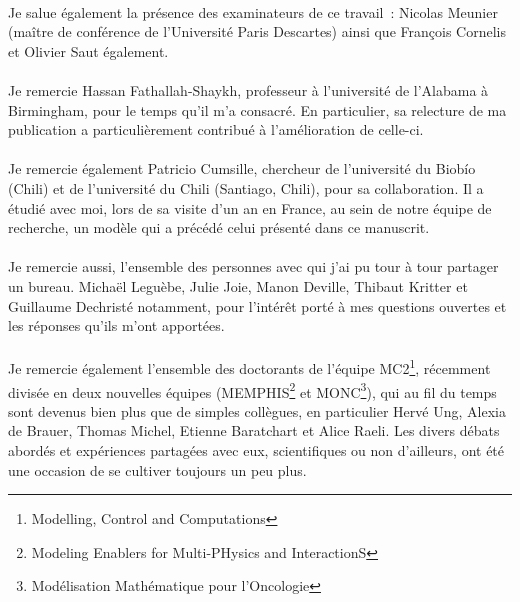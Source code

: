 \paragraph{}
Je salue également la présence des examinateurs de ce travail~: Nicolas Meunier (maître de conférence de l'Université Paris Descartes) ainsi que François Cornelis et Olivier Saut également. 


\paragraph{}
Je remercie Hassan Fathallah-Shaykh, professeur à l'université de l'Alabama à Birmingham, pour le temps qu'il m'a consacré. En particulier, sa relecture de ma publication a particulièrement contribué à l'amélioration de celle-ci.

\paragraph{}
Je remercie également Patricio Cumsille, chercheur de l'université du Biobío (Chili) et de l'université du Chili (Santiago, Chili), pour sa collaboration. Il a étudié avec moi, lors de sa visite d'un an en France, au sein de notre équipe de recherche, un modèle qui a précédé celui présenté dans ce manuscrit. 

\paragraph{}
Je remercie aussi, l'ensemble des personnes avec qui j'ai pu tour à tour partager un bureau. Michaël Leguèbe, Julie Joie, Manon Deville, Thibaut Kritter et Guillaume Dechristé notamment, pour l'intérêt porté à mes questions ouvertes et les réponses qu'ils m'ont apportées. 

\paragraph{}
Je remercie également l'ensemble des doctorants de l'équipe MC2\footnote{Modelling, Control and Computations}, récemment divisée en deux nouvelles équipes (MEMPHIS\footnote{Modeling Enablers for Multi-PHysics and InteractionS} et MONC\footnote{Modélisation Mathématique pour l'Oncologie}), qui au fil du temps sont devenus bien plus que de simples collègues, en particulier Hervé Ung, Alexia de Brauer, Thomas Michel, Etienne Baratchart et Alice Raeli. Les divers débats abordés et expériences partagées avec eux, scientifiques ou non d'ailleurs, ont été une occasion de se cultiver toujours un peu plus.

